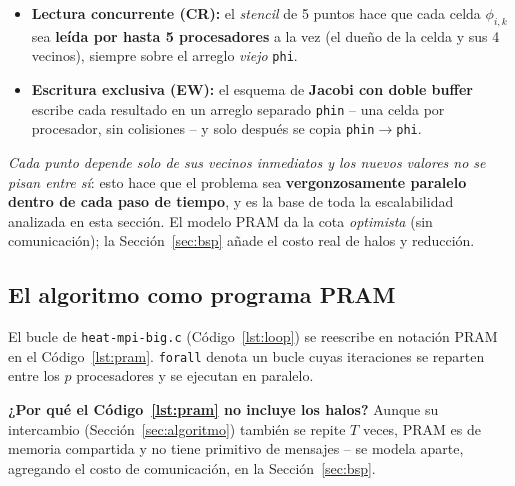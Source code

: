 \documentclass[11pt,a4paper]{article}
\begin{document}
	\begin{itemize}
		\item \textbf{Lectura concurrente (CR):} el \textit{stencil} de 5 puntos hace
		que cada celda $\phi_{i,k}$ sea \textbf{leída por hasta 5 procesadores} a la
		vez (el dueño de la celda y sus 4 vecinos), siempre sobre el arreglo
		\textit{viejo} \texttt{phi}.
		\item \textbf{Escritura exclusiva (EW):} el esquema de \textbf{Jacobi con
		doble buffer} escribe cada resultado en un arreglo separado \texttt{phin} --
		una celda por procesador, sin colisiones -- y solo después se copia
		\texttt{phin}$\to$\texttt{phi}.
	\end{itemize}

	\textit{Cada punto depende solo de sus vecinos inmediatos y los nuevos valores no
	se pisan entre sí}: esto hace que el problema sea \textbf{vergonzosamente
	paralelo dentro de cada paso de tiempo}, y es la base de toda la escalabilidad
	analizada en esta sección. El modelo PRAM da la cota \textit{optimista} (sin
	comunicación); la Sección~\ref{sec:bsp} añade el costo real de halos y reducción.

	\subsection{El algoritmo como programa PRAM}

	El bucle de \texttt{heat-mpi-big.c} (Código~\ref{lst:loop}) se reescribe en
	notación PRAM en el Código~\ref{lst:pram}. \texttt{forall} denota un bucle cuyas iteraciones se reparten entre los $p$ procesadores y se ejecutan en paralelo.

	\vspace{0.5cm}
	\textbf{¿Por qué el Código~\ref{lst:pram} no incluye los halos?} Aunque su
	intercambio (Sección~\ref{sec:algoritmo}) también se repite $T$ veces, PRAM
	es de memoria compartida y no tiene primitivo de mensajes -- se modela
	aparte, agregando el costo de comunicación, en la Sección~\ref{sec:bsp}.
	
\end{document}
